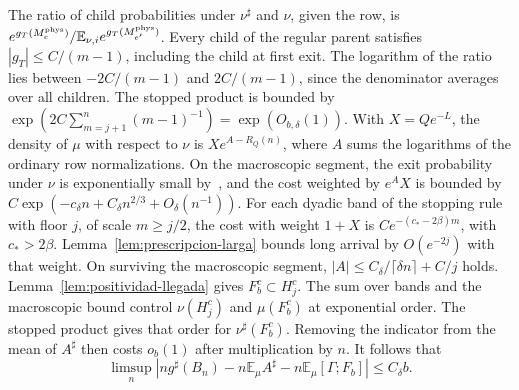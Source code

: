 The ratio of child probabilities under \(\nu^\sharp\) and \(\nu\), given the row, is
\(e^{g_T(M_e^{\rm phys})}/\mathbb E_{\nu,i}e^{g_T(M_{e'}^{\rm phys})}\). Every child of the regular
parent satisfies
\(|g_T|\le C/(m-1)\), including the child at first exit. The logarithm of the ratio lies between
\(-2C/(m-1)\) and \(2C/(m-1)\), since the denominator averages over all children. The stopped product is
bounded by \(\exp(2C\sum_{m=j+1}^n(m-1)^{-1})=\exp(O_{b,\delta}(1))\). With \(X=Qe^{-L}\), the density of
\(\mu\) with respect to \(\nu\) is \(Xe^{A-R_Q(n)}\), where \(A\) sums the logarithms of the ordinary row
normalizations. On the macroscopic segment, the exit probability under \(\nu\) is exponentially small
by~\cite[Cor.~4.12]{tc}, and the cost weighted by \(e^AX\) is bounded by \(C\exp(-c_\delta n+C_\delta
n^{2/3}+O_\delta(n^{-1}))\). For each dyadic band of the stopping rule with floor \(j\), of scale \(m\ge
j/2\), the cost with weight \(1+X\) is \(C e^{-(c_*-2\beta)m}\), with \(c_*>2\beta\).
Lemma~\ref{lem:prescripcion-larga} bounds long arrival by \(O(e^{-2j})\) with that weight. On surviving
the macroscopic segment, \(|A|\le C_\delta/\lceil\delta n\rceil+C/j\) holds.
Lemma~\ref{lem:positividad-llegada} gives \(F_b^c\subset H_j^c\). The sum over bands and the macroscopic
bound control \(\nu(H_j^c)\) and \(\mu(F_b^c)\) at exponential order. The stopped product gives that
order for \(\nu^\sharp(F_b^c)\). Removing the indicator from the mean of \(A^\sharp\) then costs
\(o_b(1)\) after multiplication by \(n\). It follows that
\begin{equation}\label{eq:signed-mean}
 \limsup_n\left|n g^\sharp(B_n)-n\mathbb E_\mu A^\sharp
                 -n\mathbb E_\mu[\Gamma;F_b]\right|\le C_\delta b .
\end{equation}






